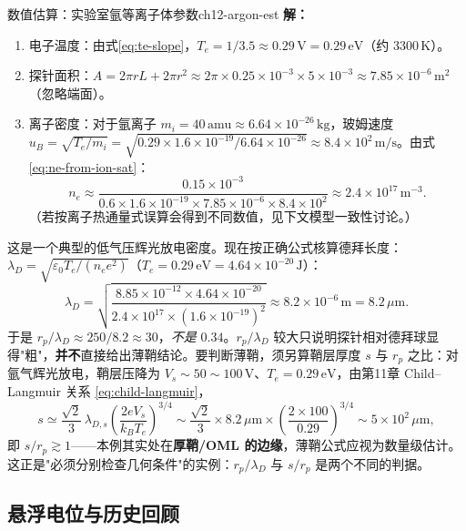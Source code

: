 \documentclass[12pt,a4paper,openany,oneside]{book}
\newcommand{\eps}{\varepsilon}
\begin{document}
\begin{example}{数值估算：实验室氩等离子体参数}{ch12-argon-est}
\textbf{解：}
\begin{enumerate}
    \item 电子温度：由式\eqref{eq:te-slope}，$T_e = 1/3.5 \approx 0.29\,\mathrm{V} = 0.29\,\mathrm{eV}$（约 $3300\,\mathrm{K}$）。
    \item 探针面积：$A = 2\pi r L + 2\pi r^2 \approx 2\pi \times 0.25\times 10^{-3}\times 5\times 10^{-3} \approx 7.85\times 10^{-6}\,\mathrm{m}^2$（忽略端面）。
    \item 离子密度：对于氩离子 $m_i = 40\,\mathrm{amu} \approx 6.64\times 10^{-26}\,\mathrm{kg}$，玻姆速度 $u_B = \sqrt{T_e/m_i} = \sqrt{0.29\times 1.6\times 10^{-19}/6.64\times 10^{-26}} \approx 8.4\times 10^{2}\,\mathrm{m/s}$。由式\eqref{eq:ne-from-ion-sat}：
    \begin{equation}
    n_e \approx \frac{0.15\times 10^{-3}}{0.6\times 1.6\times 10^{-19}\times 7.85\times 10^{-6}\times 8.4\times 10^{2}}
    \approx 2.4\times 10^{17}\,\mathrm{m}^{-3}.
    \end{equation}
    （若按离子热通量式误算会得到不同数值，见下文模型一致性讨论。）
\end{enumerate}
这是一个典型的低气压辉光放电密度。现在按正确公式核算德拜长度：$\lambda_D = \sqrt{\eps_0 T_e/(n_e e^2)}$（$T_e = 0.29\,\mathrm{eV} = 4.64\times 10^{-20}\,\mathrm{J}$）：
\begin{equation}
\lambda_D = \sqrt{\frac{8.85\times 10^{-12}\times 4.64\times 10^{-20}}{2.4\times 10^{17}\times (1.6\times 10^{-19})^2}}
\approx 8.2\times 10^{-6}\,\mathrm{m} = 8.2\,\mu\mathrm{m}.
\end{equation}
于是 $r_p/\lambda_D \approx 250/8.2 \approx 30$，\emph{不是} $0.34$。$r_p/\lambda_D$ 较大只说明探针相对德拜球显得"粗"，\textbf{并不}直接给出薄鞘结论。要判断薄鞘，须另算鞘层厚度 $s$ 与 $r_p$ 之比：对氩气辉光放电，鞘层压降为 $V_s\sim 50\sim100\,\mathrm{V}$、$T_e=0.29\,\mathrm{eV}$，由第11章 Child--Langmuir 关系 \eqref{eq:child-langmuir}，
\[
s \simeq \frac{\sqrt{2}}{3}\,\lambda_{D,s}\left(\frac{2eV_s}{k_BT_e}\right)^{3/4}
\sim \frac{\sqrt{2}}{3}\times 8.2\,\mu\mathrm{m}\times\left(\frac{2\times 100}{0.29}\right)^{3/4}
\sim 5\times 10^{2}\,\mu\mathrm{m},
\]
即 $s/r_p \gtrsim 1$——本例其实处在\textbf{厚鞘/OML 的边缘}，薄鞘公式应视为数量级估计。这正是"必须分别检查几何条件"的实例：$r_p/\lambda_D$ 与 $s/r_p$ 是两个不同的判据。
\end{example}

\subsection{悬浮电位与历史回顾}
\end{document}

